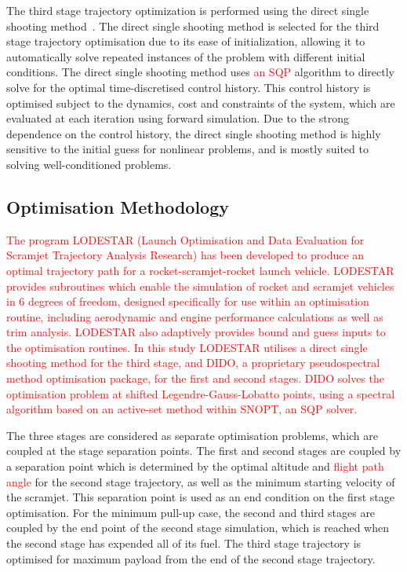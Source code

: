 \documentclass[journal]{new-aiaa}
\begin{document}
The third stage trajectory optimization is performed using the direct single shooting method~\cite{Diehl2006}. The direct single shooting method is selected for the third stage trajectory optimisation due to its ease of initialization, allowing it to automatically solve repeated instances of the problem with different initial conditions. 
The direct single shooting method uses \textcolor{red}{an SQP} algorithm to directly solve for the optimal time-discretised control history\textcolor{red}{\cite{Rao2009}}.
This control history is optimised subject to the dynamics, cost and constraints of the system, which are evaluated at each iteration using forward simulation.
Due to the strong dependence on the control history, the direct single shooting method is highly sensitive to the initial guess for nonlinear problems, and is mostly suited to solving well-conditioned problems.




\subsection{Optimisation Methodology}

\textcolor{red}{The program LODESTAR (Launch Optimisation and Data Evaluation for Scramjet Trajectory Analysis Research) has been developed to produce an optimal trajectory path for a rocket-scramjet-rocket launch vehicle. LODESTAR provides subroutines which enable the simulation of rocket and scramjet vehicles in 6 degrees of freedom, designed specifically for use within an optimisation routine, including aerodynamic and engine performance calculations as well as trim analysis. LODESTAR also adaptively provides bound and guess inputs to the optimisation routines. In this study LODESTAR utilises a direct single shooting method for the third stage, and DIDO\cite{Ross,Ross2004}, a proprietary pseudospectral method optimisation package, for the first and second stages. DIDO solves the optimisation problem at shifted Legendre-Gauss-Lobatto points, using a spectral algorithm based on an active-set method within SNOPT, an SQP solver\cite{Ross,Gill2002}.} 


	 The three stages are considered as separate optimisation problems, which are coupled at the stage separation points.
	 The first and second stages are coupled by a separation point which is determined by the optimal altitude and \textcolor{red}{flight path angle} for the second stage trajectory, as well as the minimum starting velocity of the scramjet. This separation point is used as an end condition on the first stage optimisation.
	 	 For the minimum pull-up case, the second and third stages are coupled by the end point of the second stage simulation, which is reached when the second stage has expended all of its fuel. The third stage trajectory is optimised for maximum payload from the end of the second stage trajectory.
	 
\end{document}
